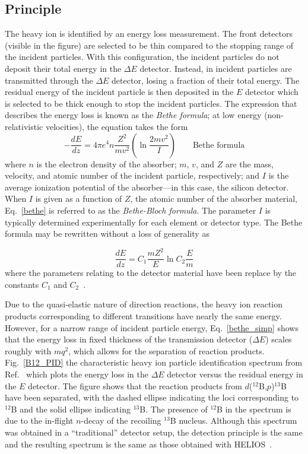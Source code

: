\subsection{Principle}
The heavy ion is identified by an energy loss measurement.  The front detectors (visible in the figure) are selected to be thin compared to the stopping range of the incident particles.  With this configuration, the incident particles do not deposit their total energy in the $\Delta E$ detector.  Instead, in incident particles are transmitted through the $\Delta E$ detector, losing a fraction of their total energy.  The residual energy of the incident particle is then deposited in the $E$ detector which is selected to be thick enough to stop the incident particles.  The expression that describes the energy loss is known as the \textit{Bethe formula}; at low energy (non-\-relativistic velocities), the equation takes the form
\begin{equation}
-\frac{dE}{dz}=4\pi e^4 n\frac{ Z^2}{m v^2} \left(\ln \frac{2mv^2}{I}\right)\qquad \textrm{Bethe formula}
\label{bethe}
\end{equation}
where $n$ is the electron density of the absorber; $m$, $v$, and $Z$  are the mass, velocity, and atomic number of the incident particle, respectively; and $I$ is the average ionization potential of the absorber---in this case, the silicon detector.  When $I$ is given as a function of $Z$, the atomic number of the absorber material, Eq.~\ref{bethe} is referred to as the \textit{Bethe-Bloch formula}.  The parameter $I$ is typically determined experimentally for each element or detector type.  The Bethe formula may be rewritten without a loss of generality as

\begin{equation}
\frac{dE}{dz}=C_1 \frac{mZ^2}{E} \ln C_2 \frac{E}{m}
\label{bethe_simp}
\end{equation}
where the parameters relating to the detector material have been replace by the constants $C_1$ and $C_2$~\cite{Knoll_1979}.  

Due to the quasi-elastic nature of direction reactions, the heavy ion reaction products corresponding to different transitions have nearly the same energy.  However, for a narrow range of incident particle energy, Eq.~\ref{bethe_simp} shows that the energy loss in fixed thickness of the transmission detector ($\Delta E$)  scales roughly with $mq^2$, which allows for the separation of reaction products.  Fig.~\ref{B12_PID} the characteristic heavy ion particle identification spectrum from Ref.~\cite{Lee_2010} which plots the energy loss in the $\Delta E$ detector versus the residual energy in the $E$ detector.  The figure shows that the reaction products from $d$($^{12}$B,$p$)$^{13}$B have been separated, with the dashed ellipse indicating the loci corresponding to $^{12}$B and the solid ellipse indicating $^{13}$B.  The presence of $^{12}$B in the spectrum is due to the in-flight $n$-decay of the recoiling $^{13}$B nucleus.  Although this spectrum was obtained in a ``traditional'' detector setup, the detection principle is the same and the resulting spectrum is the same as those obtained with HELIOS~\cite{Schiffer_2010}.

